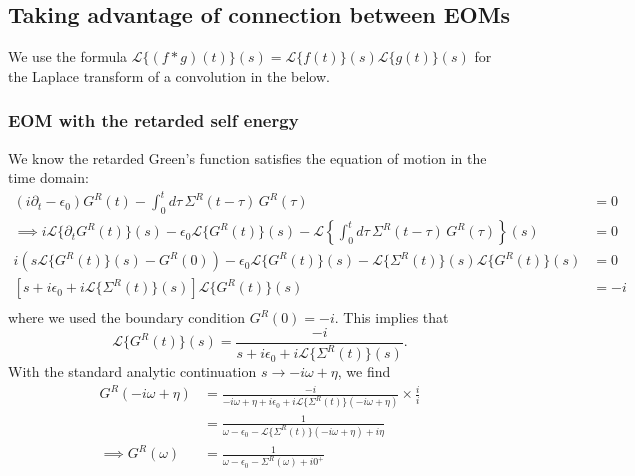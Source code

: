 \subsection{Taking advantage of connection between EOMs}

We use the formula $\mathcal{L}\{(f*g)(t)\}(s)=\mathcal{L}\{f(t)\}(s) \mathcal{L}\{g(t)\}(s)$ for the Laplace transform of a convolution in the below.
\subsubsection{EOM with the retarded self energy}
We know the retarded Green's function satisfies the equation of motion in the time domain:
\begin{align}
    (i\partial_t - \epsilon_0) G^R(t) - \int_0^t d\tau\, \Sigma^R(t - \tau)\, G^R(\tau) &= 0 \label{eq:eom_retarded} \\
\implies i\mathcal{L}\{ \partial_t G^R(t)\}(s) - \epsilon_0 \mathcal{L} \{ G^R(t)\}(s) - \mathcal{L}\left\{\int_0^t d\tau\, \Sigma^R(t - \tau)\, G^R(\tau)\right\}(s) &= 0 \\
 i \left( s \mathcal{L} \{ G^R(t)\}(s) -G^R(0)\right)- \epsilon_0 \mathcal{L} \{ G^R(t)\}(s) - \mathcal{L}\{\Sigma^R(t)\}(s) \mathcal{L}\{G^R(t)\}(s) &= 0\\
\left[s + i\epsilon_0 + i\mathcal{L}\{\Sigma^R(t)\}(s)\right] \mathcal{L}\{G^R(t)\}(s) &= -i \\
\end{align}
where we used the boundary condition $G^R(0) = -i$.
This implies that
\begin{equation}
    \mathcal{L}\{G^R(t)\}(s) = \frac{-i}{s + i\epsilon_0 + i\mathcal{L}\{\Sigma^R(t)\}(s)}.
\end{equation}
With the standard analytic continuation $s \rightarrow -i\omega + \eta$, we find
\begin{align}
    G^R(-i\omega + \eta) &= \frac{-i}{-i\omega + \eta + i\epsilon_0 + i\mathcal{L}\{\Sigma^R(t)\}(-i\omega + \eta)} \times \frac{i}{i}\\
    &= \frac{1}{\omega - \epsilon_0 - \mathcal{L}\{\Sigma^R(t)\}(-i\omega + \eta) + i\eta} \\
   \implies  G^R(\omega) &= \frac{1}{\omega - \epsilon_0 - \Sigma^R(\omega) + i0^+}
\end{align}
